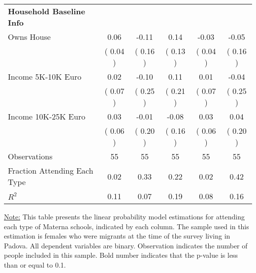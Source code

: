 \begin{table}[H]
{\begin{tabular}{lccccc}
\midrule
\textbf{Household Baseline Info} \\
\quad Owns House &      0.06 &     -0.11 &      0.14 &     -0.03 &     -0.05 \\
\quad  & (     0.04 ) & (     0.16 )  & (     0.13 )  & (     0.04 ) & (     0.16 ) \\
\quad Income 5K-10K Euro &      0.02 &     -0.10 &      0.11 &      0.01 &     -0.04 \\
\quad  & (     0.07 ) & (     0.25 )  & (     0.21 )  & (     0.07 ) & (     0.25 ) \\
\quad Income 10K-25K Euro &      0.03 &     -0.01 &     -0.08 &      0.03 &      0.04 \\
\quad  & (     0.06 ) & (     0.20 )  & (     0.16 )  & (     0.06 ) & (     0.20 ) \\
\midrule
Observations & 55 & 55 & 55 & 55 & 55 \\
Fraction Attending Each Type &      0.02 &      0.33 &      0.22 &      0.02 &      0.42 \\
\midrule
$ R^2$ &      0.11 &      0.07 &      0.19 &      0.08 &      0.16 \\
\bottomrule
\end{tabular}}
\end{table}
\begin{footnotesize}
\noindent\underline{Note:} This table presents the linear probability model estimations for attending each type of Materna schools, indicated by each column. The sample used in this estimation is females who were migrants at the time of the survey living in Padova. All dependent variables are binary. Observation indicates the number of people included in this sample. Bold number indicates that the p-value is less than or equal to 0.1.
\end{footnotesize}
